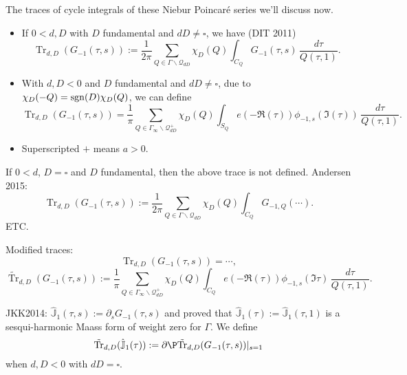 \documentclass[reqno]{amsart} 
\begin{document}
The traces of cycle integrals of these Niebur Poincar{\'e} series we'll discuss now.
\begin{itemize}
\item If $0 < d, D$ with $D$ fundamental and $d D \neq \square$, we have (DIT 2011)
  \begin{equation*}
    \operatorname{Tr}_{d, D}(G_{- 1}(\tau, s)) := \frac{1}{2 \pi}
    \sum_{Q \in \Gamma \backslash \mathcal{Q}_{d D}}
    \chi_D(Q) \int_{C_Q} G_{- 1}(\tau, s)
    \, \frac{d \tau}{ Q(\tau, 1)}.
  \end{equation*}
\item With $d, D < 0$ and $D$ fundamental and $d D \neq \square$, due to $\chi_D(- Q) = \operatorname{sgn}(D) \chi_D(Q)$, we can define
  \begin{equation*}
    \operatorname{Tr}_{d, D}(G_{- 1}(\tau, s)) =
    \frac{1}{ \pi}
    \sum_{Q \in \Gamma_\infty \backslash \mathcal{Q}_{d D}^+}
    \chi_D(Q) \int_{S_Q} e(- \Re(\tau))
    \phi_{- 1, s}(\Im (\tau))
    \, \frac{d \tau}{ Q(\tau, 1)}.
  \end{equation*}
\item Superscripted $+$ means $a > 0$.
\end{itemize}

If $0 < d$, $D  = \square$ and $D$ fundamental, then the above trace is not defined. Andersen 2015:
\begin{equation*}
  \operatorname{Tr}_{d, D}(G_{- 1}(\tau, s))
  :=
  \frac{1}{2 \pi}
  \sum_{Q \in \Gamma \backslash \mathcal{Q}_{d D}}
  \chi_D(Q) \int_{C_Q} G_{- 1, Q}(\dotsb).
\end{equation*}
ETC.


Modified traces:
\begin{equation*}
  \operatorname{Tr}_{d, D}(G_{- 1}(\tau, s)) = \dotsb,
\end{equation*}
\begin{equation*}
  \tilde{\operatorname{Tr}}_{d, D}(G_{- 1}(\tau, s)) := \frac{1}{ \pi}
  \sum_{Q \in \Gamma_\infty \backslash \mathcal{Q}_{d D}^+}
  \chi_D(Q) \int_{C_Q} e(- \Re(\tau))
  \phi_{- 1, s} (\Im \tau)
  \, \frac{d \tau}{ Q(\tau, 1)}.
\end{equation*}

JKK2014: $\hat{\mathbb{J}}_1(\tau, s) := \partial_s G_{- 1}(\tau, s)$ and proved that $\hat{\mathbb{J}}_1(\tau) := \hat{\mathbb{J}}_1(\tau, 1)$ is a sesqui-harmonic Maass form of weight zero for $\Gamma$.  We define
\begin{equation*}
  \tilde{\operatorname{Tr}}_{d, D}(\hat{\mathbb{J}}_1(\tau)) :=
  \partial \P \tilde{\operatorname{Tr}}_{d, D}(G_{- 1}(\tau, s))|_{s=1}
\end{equation*}
when  $d , D < 0$ with $d D = \square$.
\end{document}
